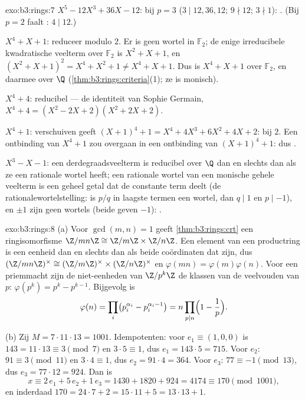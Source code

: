 \begin{solution}{exo:b3:rings:7}
\emph{$X^5 - 12X^3 + 36X - 12$}:  bij $p = 3$ ($3 \mid
12, 36, 12$; $9 \nmid 12$; $3 \nmid 1$): . (Bij $p = 2$
faalt : $4 \mid 12$.)

\emph{$X^4 + X + 1$}: reduceer modulo $2$. Er is geen wortel in
$\mathbb F_2$; de enige irreducibele kwadratische veelterm over
$\mathbb F_2$ is $X^2 + X + 1$, en $(X^2+X+1)^2 = X^4 + X^2 + 1
\neq X^4 + X + 1$. Dus is $X^4 + X + 1$  over $\mathbb
F_2$, en daarmee over $\Q$ (\cref{thm:b3:rings:criteria}(1); ze is
monisch).

\emph{$X^4 + 4$}: reducibel --- de identiteit van Sophie Germain,
$X^4 + 4 = (X^2 - 2X + 2)(X^2 + 2X + 2)$.

\emph{$X^4 + 1$}: verschuiven geeft $(X+1)^4 + 1 = X^4 + 4X^3 +
6X^2 + 4X + 2$:  bij $2$. Een ontbinding van $X^4+1$ zou
overgaan in een ontbinding van $(X+1)^4 + 1$: dus .

\emph{$X^3 - X - 1$}: een derdegraadsveelterm is reducibel over
$\Q$ dan en slechts dan als ze een rationale wortel heeft; een
rationale wortel van een monische gehele veelterm is een geheel
getal dat de constante term deelt (de rationalewortelstelling: is
$p/q$ in laagste termen een wortel, dan $q \mid 1$ en $p \mid -1$),
en $\pm 1$ zijn geen wortels (beide geven $-1$): .
\end{solution}

\begin{solution}{exo:b3:rings:8}
(a) Voor $\gcd(m, n) = 1$ geeft \cref{thm:b3:rings:crt} een
ringisomorfisme $\Z/mn\Z \cong \Z/m\Z \times \Z/n\Z$. Een element
van een productring is een eenheid dan en slechts dan als beide
coördinaten dat zijn, dus $(\Z/mn\Z)^\times \cong (\Z/m\Z)^\times
\times (\Z/n\Z)^\times$ en $\varphi(mn) = \varphi(m)\varphi(n)$.
Voor een priemmacht zijn de niet-eenheden van $\Z/p^k\Z$ de klassen
van de veelvouden van $p$: $\varphi(p^k) = p^k - p^{k-1}$.
Bijgevolg is
\[
\varphi(n) = \prod_i \bigl(p_i^{\alpha_i} -
p_i^{\alpha_i-1}\bigr) = n \prod_{p \mid n}\Bigl(1 -
\frac1p\Bigr).
\]

(b) Zij $M = 7 \cdot 11 \cdot 13 = 1001$. Idempotenten: voor $e_1
\equiv (1, 0, 0)$ is $143 = 11\cdot13 \equiv 3 \pmod 7$ en $3 \cdot
5 \equiv 1$, dus $e_1 = 143 \cdot 5 = 715$. Voor $e_2$: $91 \equiv
3 \pmod{11}$ en $3 \cdot 4 \equiv 1$, dus $e_2 = 91\cdot4 = 364$.
Voor $e_3$: $77 \equiv -1 \pmod{13}$, dus $e_3 = 77 \cdot 12 =
924$. Dan is
\[
x \equiv 2\,e_1 + 5\,e_2 + 1\,e_3 = 1430 + 1820 + 924 = 4174
\equiv 170 \pmod{1001},
\]
en inderdaad $170 = 24\cdot7 + 2 = 15\cdot11 + 5 = 13\cdot13 + 1$.
\end{solution}

